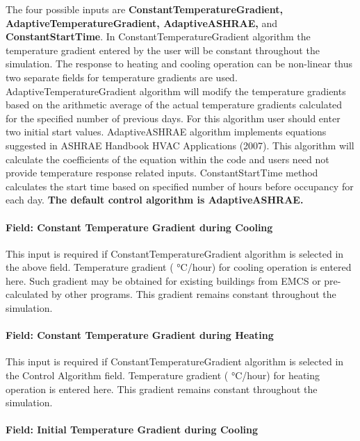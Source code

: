 The four possible inputs are \textbf{ConstantTemperatureGradient, AdaptiveTemperatureGradient, AdaptiveASHRAE,} and \textbf{ConstantStartTime}. In ConstantTemperatureGradient algorithm the temperature gradient entered by the user will be constant throughout the simulation. The response to heating and cooling operation can be non-linear thus two separate fields for temperature gradients are used. AdaptiveTemperatureGradient algorithm will modify the temperature gradients based on the arithmetic average of the actual temperature gradients calculated for the specified number of previous days. For this algorithm user should enter two initial start values. AdaptiveASHRAE algorithm implements equations suggested in ASHRAE Handbook HVAC Applications (2007). This algorithm will calculate the coefficients of the equation within the code and users need not provide temperature response related inputs. ConstantStartTime method calculates the start time based on specified number of hours before occupancy for each day. \textbf{The default control algorithm is AdaptiveASHRAE.}

\paragraph{Field: Constant Temperature Gradient during Cooling}\label{field-constant-temperature-gradient-during-cooling}

This input is required if ConstantTemperatureGradient algorithm is selected in the above field. Temperature gradient ( °C/hour) for cooling operation is entered here. Such gradient may be obtained for existing buildings from EMCS or pre-calculated by other programs. This gradient remains constant throughout the simulation.

\paragraph{Field: Constant Temperature Gradient during Heating}\label{field-constant-temperature-gradient-during-heating}

This input is required if ConstantTemperatureGradient algorithm is selected in the Control Algorithm field. Temperature gradient ( °C/hour) for heating operation is entered here. This gradient remains constant throughout the simulation.

\paragraph{Field: Initial Temperature Gradient during Cooling}\label{field-initial-temperature-gradient-during-cooling}

